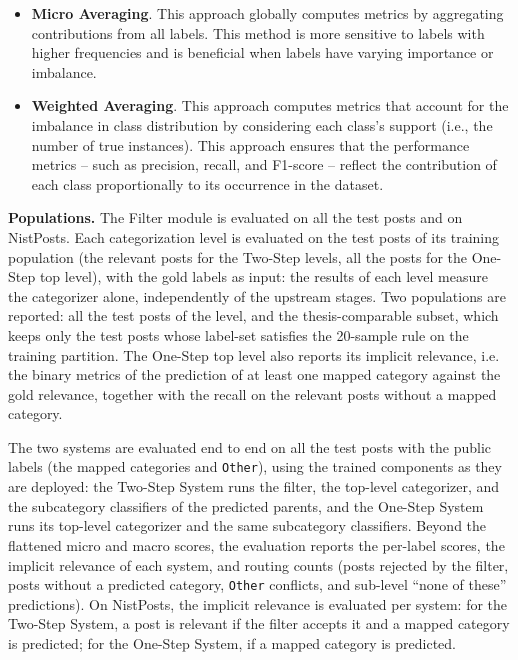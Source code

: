 \begin{itemize}
    \item \textbf{Micro Averaging}. This approach globally computes metrics by aggregating contributions from all labels. This method is more sensitive to labels with higher frequencies and is beneficial when labels have varying importance or imbalance.
    \item \textbf{Weighted Averaging}. This approach computes metrics that account for the imbalance in class distribution by considering each class's support (i.e., the number of true instances). This approach ensures that the performance metrics -- such as precision, recall, and F1-score -- reflect the contribution of each class proportionally to its occurrence in the dataset.
\end{itemize}

\textbf{Populations.} The Filter module is evaluated on all the test posts and on NistPosts. Each categorization level is evaluated on the test posts of its training population (the relevant posts for the Two-Step levels, all the posts for the One-Step top level), with the gold labels as input: the results of each level measure the categorizer alone, independently of the upstream stages. Two populations are reported: all the test posts of the level, and the thesis-comparable subset, which keeps only the test posts whose label-set satisfies the 20-sample rule on the training partition. The One-Step top level also reports its implicit relevance, i.e. the binary metrics of the prediction of at least one mapped category against the gold relevance, together with the recall on the relevant posts without a mapped category.

The two systems are evaluated end to end on all the test posts with the public labels (the mapped categories and \texttt{Other}), using the trained components as they are deployed: the Two-Step System runs the filter, the top-level categorizer, and the subcategory classifiers of the predicted parents, and the One-Step System runs its top-level categorizer and the same subcategory classifiers. Beyond the flattened micro and macro scores, the evaluation reports the per-label scores, the implicit relevance of each system, and routing counts (posts rejected by the filter, posts without a predicted category, \texttt{Other} conflicts, and sub-level ``none of these'' predictions). On NistPosts, the implicit relevance is evaluated per system: for the Two-Step System, a post is relevant if the filter accepts it and a mapped category is predicted; for the One-Step System, if a mapped category is predicted.

